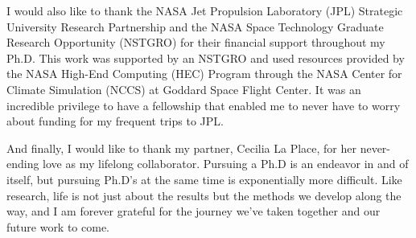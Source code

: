 I would also like to thank the NASA Jet Propulsion Laboratory (JPL) Strategic University Research Partnership and the NASA Space Technology Graduate Research Opportunity (NSTGRO) for their financial support throughout my Ph.D. 
This work was supported by an NSTGRO and used resources provided by the NASA High-End Computing (HEC) Program through the NASA Center for Climate Simulation (NCCS) at Goddard Space Flight Center.
It was an incredible privilege to have a fellowship that enabled me to never have to worry about funding for my frequent trips to JPL.

And finally, I would like to thank my partner, Cecilia La Place, for her never-ending love as my lifelong collaborator. 
Pursuing a Ph.D is an endeavor in and of itself, but pursuing Ph.D's at the same time is exponentially more difficult.
Like research, life is not just about the results but the methods we develop along the way, and I am forever grateful for the journey we've taken together and our future work to come.